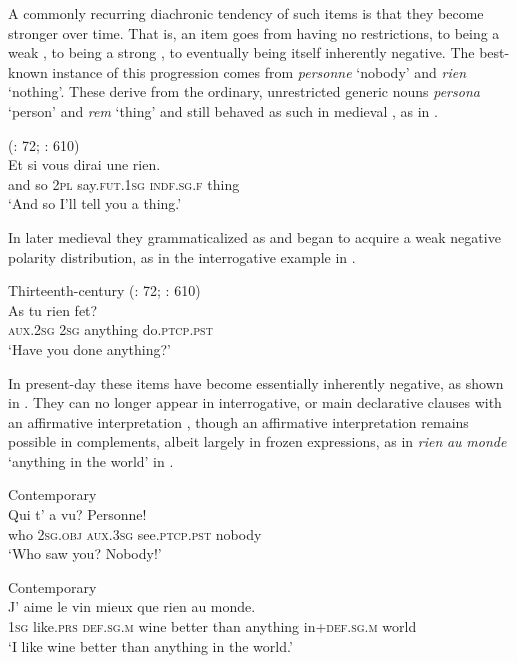 \documentclass[output=paper]{langsci/langscibook}
\begin{document}
A commonly recurring diachronic tendency of such items is that they become stronger over time. That is, an item goes from having no restrictions, to being a weak , to being a strong , to eventually being itself inherently negative. The best-known instance of this progression comes from  \textit{personne} ‘nobody’ and \textit{rien} ‘nothing’. These derive from the ordinary, unrestricted  generic nouns \textit{persona} ‘person’ and \textit{rem} ‘thing’ and still behaved as such in medieval , as in .


\ea\label{med}
{         (\citealt{Hansen2013}: 72; \citealt{Buridant2000}: 610)} \\
\gll Et si vous dirai une rien.\\
     and so \textsc{2pl} say.\textsc{fut.1sg} \textsc{indf.sg.f} thing\\
\glt ‘And so I’ll tell you a thing.’
\z

In later medieval  they grammaticalized as  and began to acquire a weak negative polarity distribution, as in the interrogative example in .

\ea\label{c13}
{Thirteenth-century  (\citealt{Hansen2013}: 72; \citealt{Buridant2000}: 610)} \\
\gll As tu rien fet?\\
     \textsc{aux.2sg} \textsc{2sg} anything do.\textsc{ptcp.pst}\\
\glt ‘Have you done anything?’
\z

In present-day  these items have become essentially inherently negative, as shown in . They can no longer appear in interrogative,  or main declarative clauses with an affirmative interpretation \citep[73]{Hansen2013}, though an affirmative interpretation remains possible in  complements, albeit largely in frozen expressions, as in \textit{rien} \textit{au} \textit{monde} ‘anything in the world’ in .

\ea\label{cont}
{       Contemporary  \citep[68]{Hansen2013}} \\
\gll Qui t’ a vu? Personne!\\
     who 2\textsc{sg.obj} \textsc{aux.3sg} see.\textsc{ptcp.pst} nobody\\
\glt ‘Who saw you? Nobody!’
\z

\ea\label{cont1}
{       Contemporary  \citep[73]{Hansen2013}} \\
\gll J’ aime le vin mieux que rien au monde.\\
     \textsc{1sg} like.\textsc{prs} \textsc{def.sg.m} wine better than anything in+\textsc{def.sg.m} world\\
\glt ‘I like wine better than anything in the world.’
\z
\end{document}
